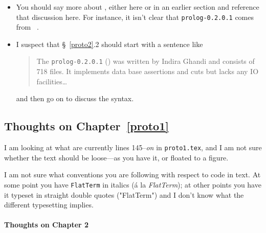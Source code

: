 \begin{scope}
\begin{enumerate}
\begin{itemize}
\item
  You should say more about \cite{prolog-lib}, either here or in an
  earlier section and reference that discussion here.  For instance, it
  isn't clear that \Verb!prolog-0.2.0.1! comes from~ \cite{prolog-lib}.
\item
  I suspect that \S~\ref{proto2}.2 should start with a sentence like 
  \begin{quote}\color[rgb]{0.3,0,0.6}\small\singlespacing
    The \Verb!prolog-0.2.0.1! (\cite{prolog-lib}) was written by Indira
    Ghandi and consists of 718  files.
    It implements data base assertions and cuts but lacks any IO
    facilities\dots
  \end{quote}
  and then go on to discuss the syntax.
\end{itemize}

\subsection{Thoughts on Chapter~\ref{proto1}}\label{subsec:thoughts-chapt-proto1}

I am looking at what are currently lines 145--\textit{on} in
\Verb!proto1.tex!, and I am not sure whether 
the text should be loose---as you have it, or floated to a figure.

I am not sure what conventions you are following with respect to code in
text.
At some point you have \Verb!FlatTerm! in italics (\'a la
\textit{FlatTerm}); at other points you have it typeset in straight
double quotes ("FlatTerm") and I don't know what the different
typesetting implies.


\paragraph{Thoughts on Chapter 2}


\end{enumerate}
\end{scope}
